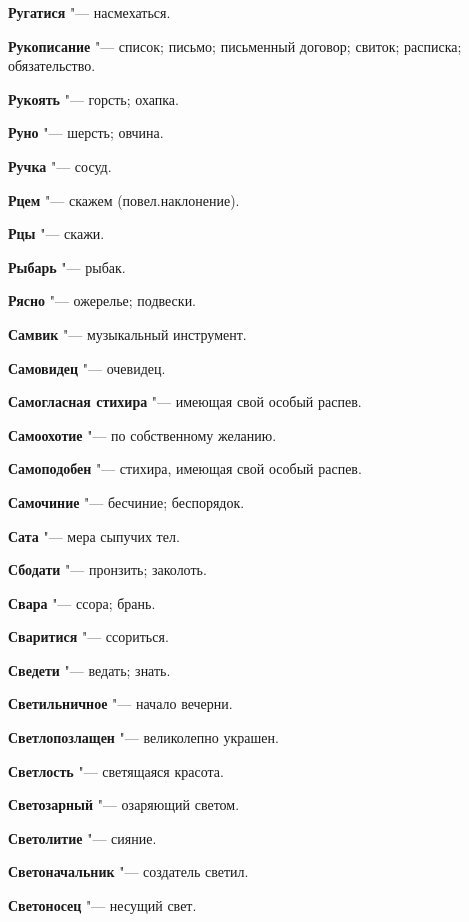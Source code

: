 \begin{mymulticols}
\noindent\textbf{Ругатися} "--- насмехаться. 

\noindent\textbf{Рукописание} "--- список; письмо; письменный договор; свиток; расписка; обязательство. 

\noindent\textbf{Рукоять} "--- горсть; охапка. 

\noindent\textbf{Руно} "--- шерсть; овчина. 

\noindent\textbf{Ручка} "--- сосуд. 

\noindent\textbf{Рцем} "--- скажем (повел.наклонение). 

\noindent\textbf{Рцы} "--- скажи. 

\noindent\textbf{Рыбарь} "--- рыбак. 

\noindent\textbf{Рясно} "--- ожерелье; подвески. 

\bukvaending


\noindent\textbf{Самвик} "--- музыкальный инструмент. 

\noindent\textbf{Самовидец} "--- очевидец. 

\noindent\textbf{Самогласная стихира} "--- имеющая свой особый распев. 

\noindent\textbf{Самоохотие} "--- по собственному желанию. 

\noindent\textbf{Самоподобен} "--- стихира, имеющая свой особый распев. 

\noindent\textbf{Самочиние} "--- бесчиние; беспорядок. 

\noindent\textbf{Сата} "--- мера сыпучих тел. 

\noindent\textbf{Сбодати} "--- пронзить; заколоть. 

\noindent\textbf{Свара} "--- ссора; брань. 

\noindent\textbf{Сваритися} "--- ссориться. 

\noindent\textbf{Сведети} "--- ведать; знать. 

\noindent\textbf{Светильничное} "--- начало вечерни. 

\noindent\textbf{Светлопозлащен} "--- великолепно украшен. 

\noindent\textbf{Светлость} "--- светящаяся красота. 

\noindent\textbf{Светозарный} "--- озаряющий светом. 

\noindent\textbf{Светолитие} "--- сияние. 

\noindent\textbf{Светоначальник} "--- создатель светил. 

\noindent\textbf{Светоносец} "--- несущий свет. 


\end{mymulticols}
